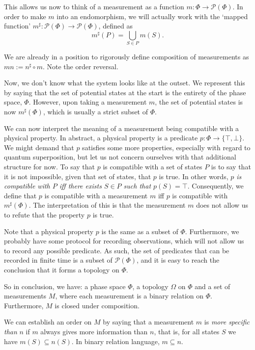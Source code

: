 \documentclass{article}
\theoremstyle{definition}
\newcommand{\ps}{\mathcal{P}}
\begin{document}
This allows us now to think of a measurement as a function $m : \Phi \to \ps(\Phi)$. In order to make $m$ into an endomorphism, we will actually work with the `mapped function' $m^\sharp : \ps(\Phi) \to \ps(\Phi)$, defined as
\[m^\sharp(P) = \bigcup_{S \in P} m(S).\]

We are already in a position to rigorously define composition of measurements as $mn := n^\sharp \circ m$. Note the order reversal.

Now, we don't know what the system looks like at the outset. We represent this by saying that the set of potential states at the start is the entirety of the phase space, $\Phi$. However, upon taking a measurement $m$, the set of potential states is now $m^\sharp(\Phi)$, which is usually a strict subset of $\Phi$.

We can now interpret the meaning of a measurement being compatible with a physical property. In abstract, a physical property is a predicate $p : \Phi \to \{\top, \bot\}$. We might demand that $p$ satisfies some more properties, especially with regard to quantum superposition, but let us not concern ourselves with that additional structure for now. To say that $p$ is compatible with a set of states $P$ is to say that it is not impossible, given that set of states, that $p$ is true. In other words, \emph{$p$ is compatible with $P$ iff there exists $S \in P$ such that $p(S) = \top$}. Consequently, we define that $p$ is compatible with a measurement $m$ iff $p$ is compatible with $m^\sharp(\Phi)$. The interpretation of this is that the measurement $m$ does not allow us to refute that the property $p$ is true.

Note that a physical property $p$ is the same as a subset of $\Phi$. Furthermore, we probably have some protocol for recording observations, which will not allow us to record any possible predicate. As such, the set of predicates that can be recorded in finite time is a subset of $\ps(\Phi)$, and it is easy to reach the conclusion that it forms a topology on $\Phi$.

So in conclusion, we have: a phase space $\Phi$, a topology $\Omega$ on $\Phi$ and a set of measurements $M$, where each measurement is a binary relation on $\Phi$. Furthermore, $M$ is closed under composition.

We can establish an order on $M$ by saying that a measurement $m$ is \emph{more specific than} $n$ if $m$ always gives more information than $n$, that is, for all states $S$ we have $m(S) \subseteq n(S)$. In binary relation language, $m \subseteq n$.
\end{document}
